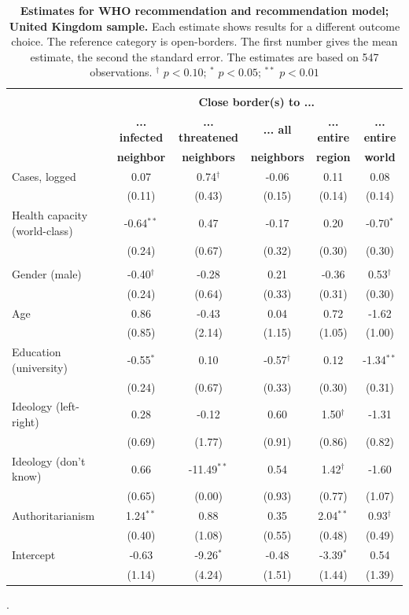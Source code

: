 \begin{table}[ht!]
\begin{center}
\footnotesize
\renewcommand{\arraystretch}{1.05}
\begin{tabular}{@{\extracolsep{4.8pt}}lccccc} 
\\[-1.8ex]\hline \\[-1.8ex]
 & \multicolumn{5}{c}{\normalsize{\textbf{Close border(s) to ...}}}
\\
  & \small{\textbf{... infected}} & \small{\textbf{... threatened}} & \small{\textbf{... all}} & \small{\textbf{... entire }} & \small{\textbf{... entire}}
 \\
  & \small{\textbf{neighbor}} & \small{\textbf{neighbors}} & \small{\textbf{neighbors}} & \small{\textbf{region}} & \small{\textbf{world}}
 \\
\hline
Cases, logged & 0.07 & 0.74$^{\dag}$ & -0.06 & 0.11 & 0.08\\
 & (0.11) & (0.43) & (0.15) & (0.14) & (0.14)\\
Health capacity (world-class) & -0.64$^{**}$ & 0.47 & -0.17 & 0.20 & -0.70$^{*}$\\
 & (0.24) & (0.67) & (0.32) & (0.30) & (0.30)\\
\\
Gender (male) & -0.40$^{\dag}$ & -0.28 & 0.21 & -0.36 & 0.53$^{\dag}$\\
 & (0.24) & (0.64) & (0.33) & (0.31) & (0.30)\\
Age & 0.86 & -0.43 & 0.04 & 0.72 & -1.62\\
 & (0.85) & (2.14) & (1.15) & (1.05) & (1.00)\\
Education (university) & -0.55$^{*}$ & 0.10 & -0.57$^{\dag}$ & 0.12 & -1.34$^{**}$\\
 & (0.24) & (0.67) & (0.33) & (0.30) & (0.31)\\
Ideology (left-right) & 0.28 & -0.12 & 0.60 & 1.50$^{\dag}$ & -1.31\\
 & (0.69) & (1.77) & (0.91) & (0.86) & (0.82)\\
Ideology (don't know) & 0.66 & -11.49$^{**}$ & 0.54 & 1.42$^{\dag}$ & -1.60\\
 & (0.65) & (0.00) & (0.93) & (0.77) & (1.07)\\
Authoritarianism & 1.24$^{**}$ & 0.88 & 0.35 & 2.04$^{**}$ & 0.93$^{\dag}$\\
 & (0.40) & (1.08) & (0.55) & (0.48) & (0.49)\\
Intercept & -0.63 & -9.26$^{*}$ & -0.48 & -3.39$^{*}$ & 0.54\\
 & (1.14) & (4.24) & (1.51) & (1.44) & (1.39)\\
\hline
\hline
\end{tabular}
\caption{\textbf{Estimates for WHO recommendation and recommendation model; United Kingdom sample.} Each estimate shows results for a different outcome choice. The reference category is open-borders. The first number gives the mean estimate, 
                the second the standard error. The estimates are based on 547 observations. $^{\dag}$ $p < 0.10$; $^{*}$ $p < 0.05$; $^{**}$ $p < 0.01$}.
\label{Tab:MainUK_4}
\end{center}
\end{table}
